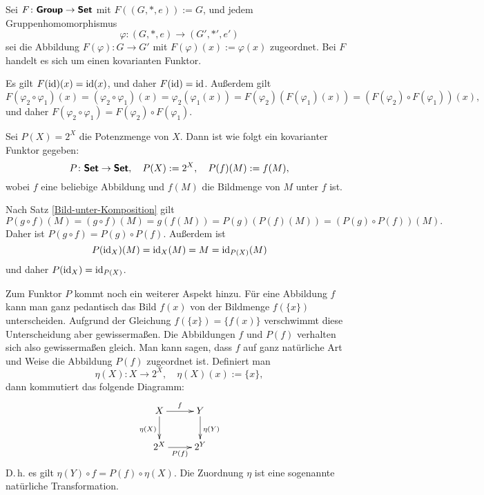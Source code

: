 \begin{Satz}[Vergissfunktor]\newlinefirst
Sei $F\colon\textsf{\textbf{Group}}\to\textsf{\textbf{Set}}$ mit $F((G,*,e)):=G$,
und jedem Gruppenhomomorphismus%
\[\varphi\colon (G,*,e)\to (G',*',e')\]
sei die Abbildung $F(\varphi)\colon G\to G'$ mit
$F(\varphi)(x):=\varphi(x)$ zugeordnet. Bei $F$ handelt
es sich um einen kovarianten Funktor.
\end{Satz}
Es gilt $F(\operatorname{id})(x) = \operatorname{id}(x)$, und daher $F(\operatorname{id})=\operatorname{id}$.
Außerdem gilt%
\[
F(\varphi_2\circ\varphi_1)(x) = (\varphi_2\circ\varphi_1)(x)
= \varphi_2(\varphi_1(x))
= F(\varphi_2)(F(\varphi_1)(x))
= (F(\varphi_2)\circ F(\varphi_1))(x),
\]
und daher $F(\varphi_2\circ\varphi_1)
= F(\varphi_2)\circ F(\varphi_1)$.\;\qedsymbol

\begin{Satz} Sei $P(X)=2^X$ die Potenzmenge von $X$. Dann ist
wie folgt ein kovarianter Funktor gegeben:
\[P\colon\textsf{\textbf{Set}}\to\textsf{\textbf{Set}},\quad
P(X):=2^X,\quad P(f)(M):=f(M),\]
wobei $f$ eine beliebige Abbildung
und $f(M)$ die Bildmenge von $M$ unter $f$ ist.
\end{Satz}
 Nach Satz \ref{Bild-unter-Komposition} gilt
\[P(g\circ f)(M) = (g\circ f)(M) = g(f(M))
= P(g)(P(f)(M)) = (P(g)\circ P(f))(M).\]
Daher ist $P(g\circ f)=P(g)\circ P(f)$. Außerdem ist
\[P(\operatorname{id}_X)(M) = \operatorname{id}_X(M) = M = \operatorname{id}_{P(X)}(M)\]
und daher $P(\operatorname{id}_X)=\operatorname{id}_{P(X)}$.\;\qedsymbol

Zum Funktor $P$ kommt noch ein weiterer Aspekt hinzu.
Für eine Abbildung $f$ kann man ganz pedantisch das
Bild $f(x)$ von der Bildmenge $f(\{x\})$ unterscheiden.
Aufgrund der Gleichung $f(\{x\})=\{f(x)\}$ verschwimmt diese
Unterscheidung aber gewissermaßen.
Die Abbildungen $f$ und $P(f)$ verhalten sich also
gewissermaßen gleich. Man kann sagen, dass $f$
auf ganz natürliche Art und Weise die Abbildung $P(f)$
zugeordnet ist. Definiert man
\[\eta(X)\colon X\to 2^X,\quad \eta(X)(x):=\{x\},\]
dann kommutiert das folgende Diagramm:
\[\xymatrix{
X \ar[r]^f \ar[d]_{\eta(X)} & Y \ar[d]^{\eta(Y)} \\
2^X \ar[r]_{P(f)} & 2^Y }\]
D.\,h. es gilt $\eta(Y)\circ f = P(f)\circ\eta(X)$.
Die Zuordnung $\eta$ ist eine sogenannte natürliche Transformation.

